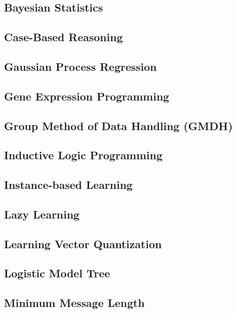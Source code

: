 \documentclass{report}
\begin{document}
	\subsection{Bayesian Statistics}
	\label{subsec:bayesian_statistics}

	\subsection{Case-Based Reasoning}

	\subsection{Gaussian Process Regression}

	\subsection{Gene Expression Programming}

	\subsection{Group Method of Data Handling (GMDH)}

	\subsection{Inductive Logic Programming}

	\subsection{Instance-based Learning}

	\subsection{Lazy Learning}

	\subsection{Learning Vector Quantization}

	\subsection{Logistic Model Tree}

	\subsection{Minimum Message Length}
\end{document}
